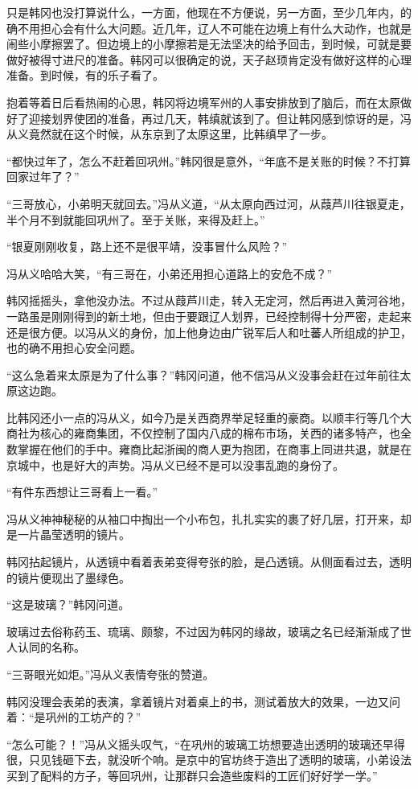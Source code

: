 只是韩冈也没打算说什么，一方面，他现在不方便说，另一方面，至少几年内，的确不用担心会有什么大问题。近几年，辽人不可能在边境上有什么大动作，也就是闹些小摩擦罢了。但边境上的小摩擦若是无法坚决的给予回击，到时候，可就是要做好被得寸进尺的准备。韩冈可以很确定的说，天子赵顼肯定没有做好这样的心理准备。到时候，有的乐子看了。

抱着等着日后看热闹的心思，韩冈将边境军州的人事安排放到了脑后，而在太原做好了迎接划界使团的准备，再过几天，韩缜就该到了。但让韩冈感到惊讶的是，冯从义竟然就在这个时候，从东京到了太原这里，比韩缜早了一步。

“都快过年了，怎么不赶着回巩州。”韩冈很是意外，“年底不是关账的时候？不打算回家过年了？”

“三哥放心，小弟明天就回去。”冯从义道，“从太原向西过河，从葭芦川往银夏走，半个月不到就能回巩州了。至于关账，来得及赶上。”

“银夏刚刚收复，路上还不是很平靖，没事冒什么风险？”

冯从义哈哈大笑，“有三哥在，小弟还用担心道路上的安危不成？”

韩冈摇摇头，拿他没办法。不过从葭芦川走，转入无定河，然后再进入黄河谷地，一路虽是刚刚得到的新土地，但由于要跟辽人划界，已经控制得十分严密，走起来还是很方便。以冯从义的身份，加上他身边由广锐军后人和吐蕃人所组成的护卫，也的确不用担心安全问题。

“这么急着来太原是为了什么事？”韩冈问道，他不信冯从义没事会赶在过年前往太原这边跑。

比韩冈还小一点的冯从义，如今乃是关西商界举足轻重的豪商。以顺丰行等几个大商社为核心的雍商集团，不仅控制了国内八成的棉布市场，关西的诸多特产，也全数掌握在他们的手中。雍商比起浙闽的商人更为抱团，在商事上同进共退，就是在京城中，也是好大的声势。冯从义已经不是可以没事乱跑的身份了。

“有件东西想让三哥看上一看。”

冯从义神神秘秘的从袖口中掏出一个小布包，扎扎实实的裹了好几层，打开来，却是一片晶莹透明的镜片。

韩冈拈起镜片，从透镜中看着表弟变得夸张的脸，是凸透镜。从侧面看过去，透明的镜片便现出了墨绿色。

“这是玻璃？”韩冈问道。

玻璃过去俗称药玉、琉璃、颇黎，不过因为韩冈的缘故，玻璃之名已经渐渐成了世人认同的名称。

“三哥眼光如炬。”冯从义表情夸张的赞道。

韩冈没理会表弟的表演，拿着镜片对着桌上的书，测试着放大的效果，一边又问着：“是巩州的工坊产的？”

“怎么可能？！”冯从义摇头叹气，“在巩州的玻璃工坊想要造出透明的玻璃还早得很，只见钱砸下去，就没听个响。是京中的官坊终于造出了透明的玻璃，小弟设法买到了配料的方子，等回巩州，让那群只会造些废料的工匠们好好学一学。”

